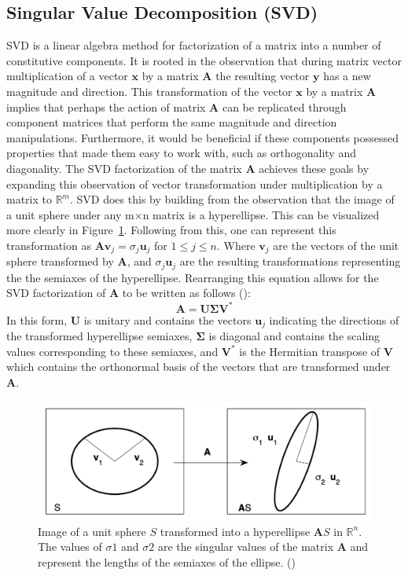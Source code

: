 \documentclass{article}
\begin{document}
\subsection{Singular Value Decomposition (SVD)}\label{svdTheory}
SVD is a linear algebra method for factorization of a matrix into a number of constitutive components. It is rooted in the observation that during matrix vector multiplication of a vector $\mathbf{x}$ by a matrix $\mathbf{A}$ the resulting vector $\mathbf{y}$ has a new magnitude and direction. This transformation of the vector $\mathbf{x}$ by a matrix $\mathbf{A}$ implies that perhaps the action of matrix $\mathbf{A}$ can be replicated through component matrices that perform the same magnitude and direction manipulations. Furthermore, it would be beneficial if these components possessed properties that made them easy to work with, such as orthogonality and diagonality. The SVD factorization of the matrix $\mathbf{A}$ achieves these goals by expanding this observation of vector transformation under multiplication by a matrix to $\mathbb{R}^{m}$. SVD does this by building from the observation that the image of a unit sphere under any m$\times$n matrix is a hyperellipse. This can be visualized more clearly in Figure~\ref{fig:hype}. Following from this, one can represent this transformation as $\mathbf{A}\mathbf{v}_{j} = \sigma_{j}\mathbf{u}_{j}$ for $1\leq j\leq n$. Where $\mathbf{v}_{j}$ are the vectors of the unit sphere transformed by $\mathbf{A}$, and $\sigma_{j}\mathbf{u}_{j}$ are the resulting transformations representing the the semiaxes of the hyperellipse. Rearranging this equation allows for the SVD factorization of $\mathbf{A}$ to be written as follows (\cite{kutz_2013}):
\begin{equation}\label{eq:svd}
\mathbf{A}= \mathbf{U}\boldsymbol{\Sigma} \mathbf{V}^*
\end{equation}
In this form, $\mathbf{U}$ is unitary and contains the vectors $\mathbf{u}_{j}$ indicating the directions of the transformed hyperellipse semiaxes, $\boldsymbol{\Sigma}$ is diagonal and contains the scaling values corresponding to these semiaxes, and $\mathbf{V}^{*}$ is the Hermitian transpose of $\mathbf{V}$ which contains the orthonormal basis of the vectors that are transformed under $\mathbf{A}$.
\begin{figure}[t]
    \centering
    \includegraphics[width=0.435\linewidth]{Screen Shot 2020-02-25 at 10.05.25 AM.png}
    \caption{Image of a unit sphere $\mathit{S}$ transformed into a hyperellipse $\mathbf{A}\mathit{S}$ in $\mathbb{R}^{n}$. The values of $\sigma1$ and $\sigma2$ are the singular values of the matrix $\mathbf{A}$ and represent the lengths of the semiaxes of the ellipse. (\cite{kutz_2013})}
    \label{fig:hype}
\end{figure}
\end{document}
